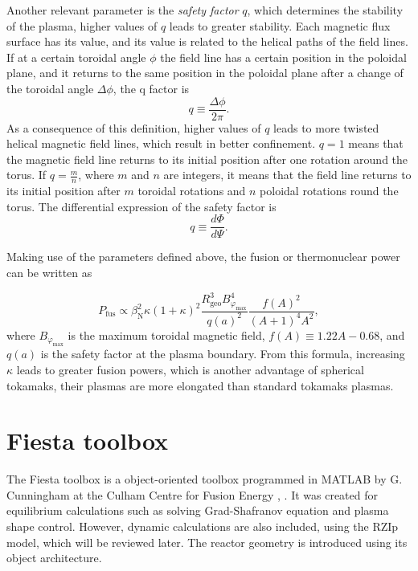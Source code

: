 \documentclass[a4paper,12pt,oneside]{book}
\begin{document}
Another relevant parameter is the \textit{safety factor} $q$, which determines the stability of the plasma, higher values of $q$ leads to greater stability. Each magnetic flux surface has its value, and its value is related to the helical paths of the field lines. If at a certain toroidal angle $\phi$ the field line has a certain position in the poloidal plane, and it returns to the same position in the poloidal plane after a change of the toroidal angle $\Delta \phi$, the q factor is
%
\begin{equation} \label{def q}
q \equiv \dfrac{\Delta \phi}{2 \pi}.
\end{equation}
%
As a consequence of this definition, higher values of $q$ leads to more twisted helical magnetic field lines, which result in better confinement. $q=1$ means that the magnetic field line returns to its initial position after one rotation around the torus. If $q=\frac{m}{n}$, where $m$ and $n$ are integers, it means that the field line returns to its initial position after $m$ toroidal rotations and $n$ poloidal rotations round the torus. The differential expression of the safety factor is
\begin{equation}\label{def q con flujos}
q \equiv \dfrac{d \Phi}{d \Psi}.
\end{equation}

Making use of the parameters defined above, the fusion or thermonuclear power can be written as \cite{FusionPower}

\begin{equation}
P_\text{fus} \propto \beta_\text{N}^2 \kappa (1+\kappa)^2 \dfrac{R_\text{geo}^3 B_{\varphi_\text{max}}^4}{q(a)^2} \dfrac{f(A)^2}{(A+1)^4 A^2},
\end{equation}
where $B_{\varphi_\text{max}}$ is the maximum toroidal magnetic field, $f(A) \equiv 1.22 A-0.68$, and $q(a)$ is the safety factor at the plasma boundary. From this formula, increasing $\kappa$ leads to greater fusion powers, which is another advantage of spherical tokamaks, their plasmas are more elongated than standard tokamaks plasmas.


\chapter{Fiesta toolbox}

The Fiesta toolbox is a object-oriented toolbox programmed in MATLAB by G. Cunningham at the Culham Centre for Fusion Energy \cite{Pangione_Fiesta}, \cite{Windridge_Fiesta}. It was created for equilibrium calculations such as solving Grad-Shafranov equation and plasma shape control. However, dynamic calculations are also included, using the RZIp model, which will be reviewed later. The reactor geometry is introduced using its object architecture.
\end{document}
